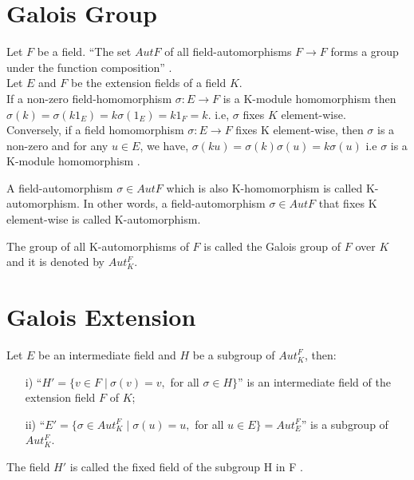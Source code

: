 \section{Galois Group}
Let \(F\) be a field. ``The set \(AutF\) of all field-automorphisms \(F \rightarrow F \) forms a group under the function composition'' \cite{hunger}.\\[3mm]
\noindent
Let \(E\) and \(F\) be the extension fields of a field \(K\).\\
If a non-zero field-homomorphism \(\sigma : E \rightarrow F\) is a K-module homomorphism then\\
\(\sigma(k)=\sigma(k1_E)=k\sigma(1_E)=k1_F=k\).\hspace{7mm}
i.e, \(\sigma\) fixes \(K\) element-wise.\\
Conversely, if a field homomorphism \(\sigma : E \rightarrow F\) fixes K element-wise, then \(\sigma\) is a non-zero and for any \(u \in E\), we have, \(\sigma(ku)=\sigma(k)\sigma(u)=k\sigma(u)\)
i.e \(\sigma\) is a K-module homomorphism \cite{hunger}.
\begin{definition} \cite{hunger}
  A field-automorphism \(\sigma \in Aut F\) which is also K-homomorphism is called K-automorphism. In other words, a field-automorphism \(\sigma \in Aut F\) that fixes K element-wise is called K-automorphism.
\end{definition}

\begin{definition} \cite{hunger}
  The group of all K-automorphisms of \(F\) is called the Galois group of \(F\) over \(K\) and it is denoted by \(Aut_K^F\).
\end{definition}

\section{Galois Extension}
Let \(E\) be an intermediate field and \(H\) be a subgroup of \(Aut_K^F\), then:
\begin{enumerate}
\item[i)] ``\(H' = \{v \in F \; | \: \sigma(v)=v,\) for all \(\sigma \in H \}\)'' \cite{hunger} is an intermediate field of the extension field \(F\) of \(K\);
\item[ii)] ``\(E' = \{\sigma \in Aut_K^F \; | \; \sigma(u)=u,\) for all \(u \in E\}=Aut_E^F\)'' \cite{hunger} is a subgroup of \(Aut_K^F\).
\end{enumerate}

The field \(H'\) is called the fixed field of the subgroup H in F \cite{hunger}.


